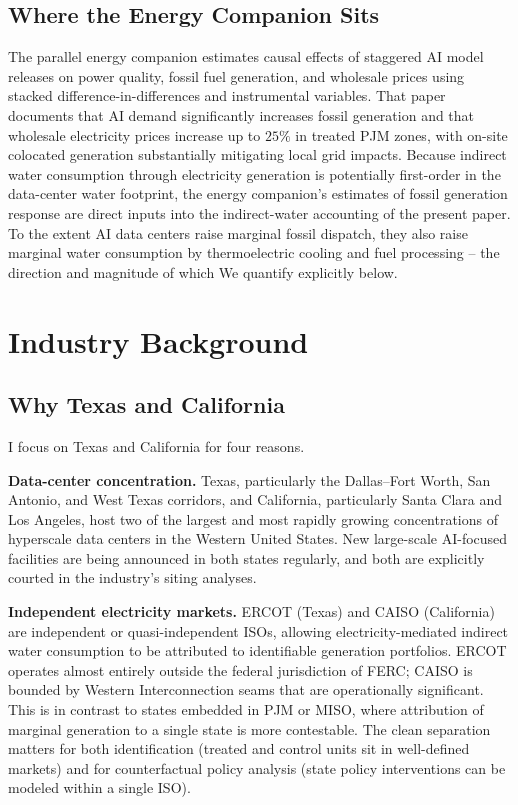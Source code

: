 \documentclass[11pt, letterpaper]{article}
\begin{document}
\subsection{Where the Energy Companion Sits}

The parallel energy companion \citep{Golden_Energy_companion} estimates causal effects of staggered AI model releases on power quality, fossil fuel generation, and wholesale prices using stacked difference-in-differences and instrumental variables. That paper documents that AI demand significantly increases fossil generation and that wholesale electricity prices increase up to $25\%$ in treated PJM zones, with on-site colocated generation substantially mitigating local grid impacts. Because indirect water consumption through electricity generation is potentially first-order in the data-center water footprint, the energy companion's estimates of fossil generation response are direct inputs into the indirect-water accounting of the present paper. To the extent AI data centers raise marginal fossil dispatch, they also raise marginal water consumption by thermoelectric cooling and fuel processing -- the direction and magnitude of which We quantify explicitly below.

\section{Industry Background}
\label{sec:background}

\subsection{Why Texas and California}

I focus on Texas and California for four reasons.

\textbf{Data-center concentration.} Texas, particularly the Dallas--Fort Worth, San Antonio, and West Texas corridors, and California, particularly Santa Clara and Los Angeles, host two of the largest and most rapidly growing concentrations of hyperscale data centers in the Western United States. New large-scale AI-focused facilities are being announced in both states regularly, and both are explicitly courted in the industry's siting analyses.

\textbf{Independent electricity markets.} ERCOT (Texas) and CAISO (California) are independent or quasi-independent ISOs, allowing electricity-mediated indirect water consumption to be attributed to identifiable generation portfolios. ERCOT operates almost entirely outside the federal jurisdiction of FERC; CAISO is bounded by Western Interconnection seams that are operationally significant. This is in contrast to states embedded in PJM or MISO, where attribution of marginal generation to a single state is more contestable. The clean separation matters for both identification (treated and control units sit in well-defined markets) and for counterfactual policy analysis (state policy interventions can be modeled within a single ISO).
\end{document}
